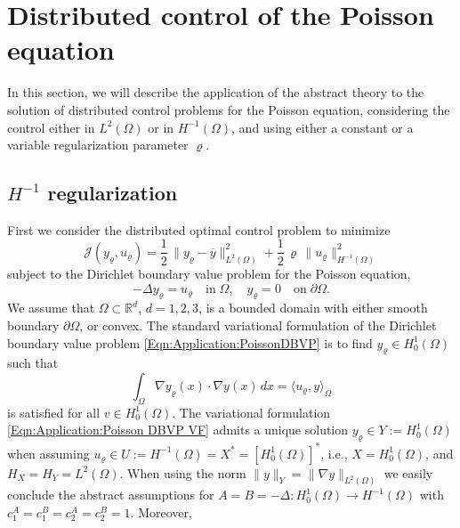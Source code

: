 \documentclass{article}
\numberwithin{equation}{section}
\begin{document}
\section{Distributed control of the Poisson equation}
\label{Section:Application}
In this section, we will describe the application of the abstract theory
to the solution of distributed control problems for the Poisson
equation, considering the control either in $L^2(\Omega)$ or in
$H^{-1}(\Omega)$, and using either a constant or a variable regularization
parameter $\varrho$.

\subsection{$H^{-1}$ regularization}
\label{Subsection:Application:EnergyRegularization}
First we consider the distributed optimal control problem to minimize
\begin{equation}\label{Eqn:Application:PoissonFunctional Energy}
  {\mathcal{J}}(y_\varrho,u_\varrho) =
  \frac{1}{2} \, \| y_\varrho - \overline{y} \|^2_{L^2(\Omega)} +
  \frac{1}{2} \, \varrho \, \| u_\varrho \|^2_{H^{-1}(\Omega)}
\end{equation}
subject to the Dirichlet boundary value problem for the Poisson equation,
\begin{equation}\label{Eqn:Application:PoissonDBVP}
  - \Delta y_\varrho = u_\varrho \quad \mbox{in} \; \Omega,
  \quad y_\varrho =0 \quad \mbox{on} \; \partial \Omega .
\end{equation}
We assume that $\Omega \subset {\mathbb{R}}^d$, $d=1,2,3$, is a bounded
domain with either smooth boundary $\partial \Omega$, or convex.
The standard variational formulation of the Dirichlet boundary value
problem \eqref{Eqn:Application:PoissonDBVP} is to find
$y_\varrho \in H^1_0(\Omega)$ such that
\begin{equation}\label{Eqn:Application:Poisson DBVP VF}
  \int_\Omega \nabla y_\varrho(x) \cdot \nabla y(x) \, dx =
  \langle u_\varrho , y \rangle_\Omega
\end{equation}
is satisfied for all $v \in H^1_0(\Omega)$. The variational formulation
\eqref{Eqn:Application:Poisson DBVP VF} admits a unique solution
$y_\varrho \in Y := H^1_0(\Omega)$ when assuming
$u_\varrho \in U:= H^{-1}(\Omega) = X^* = [H^1_0(\Omega)]^*$, i.e.,
$X=H^1_0(\Omega)$, and $H_X = H_Y = L^2(\Omega)$.
When using the norm $\| y \|_Y = \| \nabla y \|_{L^2(\Omega)}$ we easily
conclude the abstract assumptions for  
$A = B = - \Delta : H^1_0(\Omega) \to H^{-1}(\Omega)$
with $c_1^A = c_1^B = c_2^A = c_2^B = 1$. Moreover,
\end{document}
